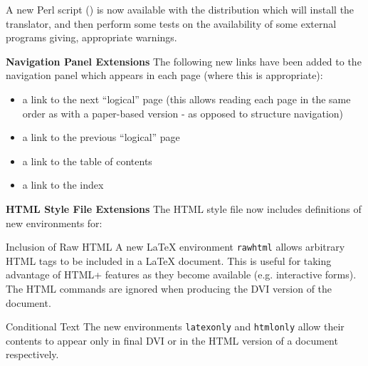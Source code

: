 \begin{htmllist}
A new Perl script () is now available with the distribution
which will install the translator, and then perform some tests on the
availability
of some external
programs giving, appropriate warnings.
\item[\textbf{Navigation Panel Extensions}]
The following new links have been added to the navigation panel which
appears in each page
(where this is appropriate):
\begin{itemize}
\item a link to the next ``logical'' page (this allows reading each
page in the same order as with a paper-based version - as opposed to
structure navigation)
\item a link to the previous ``logical'' page 
\item a link to the table of contents
\item a link to the index 
\end{itemize}
\item[\textbf{HTML Style File Extensions}]
The HTML style file  now includes definitions of new 
environments for:
\begin{htmllist}
\item[Inclusion of Raw HTML]
A new LaTeX environment \texttt{rawhtml} allows
arbitrary
HTML tags to be included in a LaTeX document. This is useful for
taking
advantage of HTML+ features as they become available (e.g. interactive
forms).
The HTML commands are ignored when producing the DVI version of the
document.
\label{sec:cond}
\item[Conditional Text]
The new environments \texttt{latexonly} and \texttt{htmlonly} allow their
contents to appear only in final DVI or in the HTML version of a
document respectively. 


\end{htmllist}
\end{htmllist}
